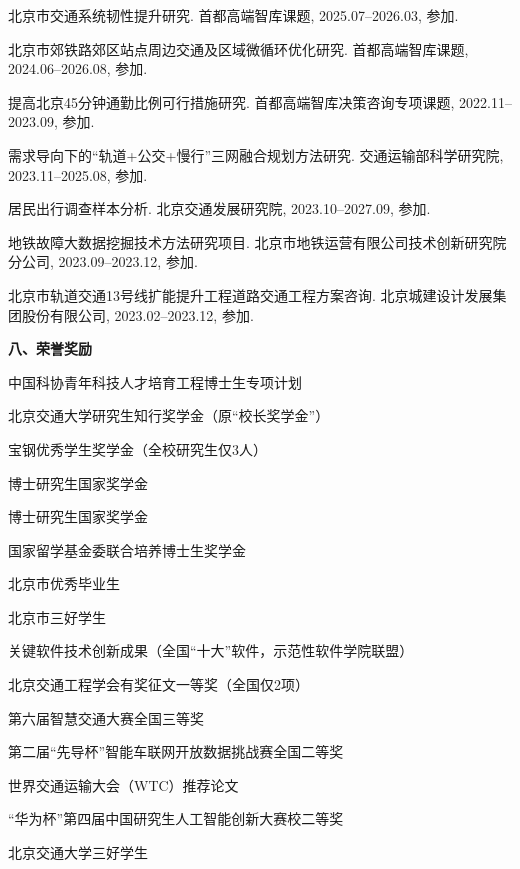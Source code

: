 \begin{enumerate}[leftmargin=*, parsep=5pt, label={[\arabic*]}]
	\item 北京市交通系统韧性提升研究. 首都高端智库课题, 2025.07--2026.03, 参加.

	\item 北京市郊铁路郊区站点周边交通及区域微循环优化研究. 首都高端智库课题, 2024.06--2026.08, 参加.

	\item 提高北京45分钟通勤比例可行措施研究. 首都高端智库决策咨询专项课题, 2022.11--2023.09, 参加.

	\item 需求导向下的“轨道+公交+慢行”三网融合规划方法研究. 交通运输部科学研究院, 2023.11--2025.08, 参加.

	\item 居民出行调查样本分析. 北京交通发展研究院, 2023.10--2027.09, 参加.

	\item 地铁故障大数据挖掘技术方法研究项目. 北京市地铁运营有限公司技术创新研究院分公司, 2023.09--2023.12, 参加.

	\item 北京市轨道交通13号线扩能提升工程道路交通工程方案咨询. 北京城建设计发展集团股份有限公司, 2023.02--2023.12, 参加.

\end{enumerate}

\vspace{10pt}
\textbf{八、荣誉奖励}
\vspace{5pt}

中国科协青年科技人才培育工程博士生专项计划

北京交通大学研究生知行奖学金（原``校长奖学金''）

宝钢优秀学生奖学金（全校研究生仅3人）

博士研究生国家奖学金

博士研究生国家奖学金

国家留学基金委联合培养博士生奖学金

北京市优秀毕业生

北京市三好学生

关键软件技术创新成果（全国“十大”软件，示范性软件学院联盟）

北京交通工程学会有奖征文一等奖（全国仅2项）

第六届智慧交通大赛全国三等奖

第二届“先导杯”智能车联网开放数据挑战赛全国二等奖

世界交通运输大会（WTC）推荐论文

“华为杯”第四届中国研究生人工智能创新大赛校二等奖

北京交通大学三好学生


